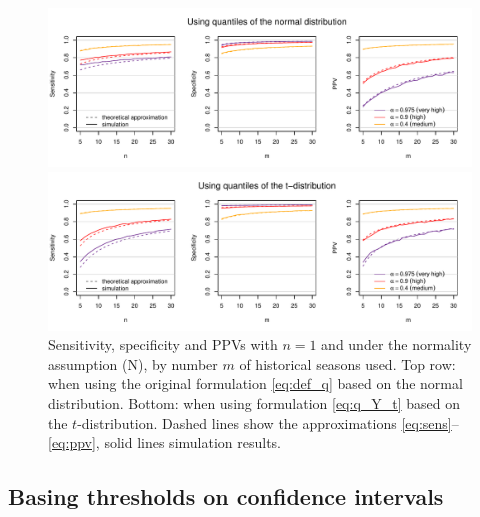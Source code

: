 \documentclass[12pt]{article}
\begin{document}
\begin{figure}[h!]
\begin{center}
\includegraphics[scale=0.75]{figure/analytical_sens_spec.pdf} \vspace{-5mm}

\includegraphics[scale=0.75]{figure/analytical_sens_spec_t.pdf}
\end{center}

\vspace{-10mm}

\caption{Sensitivity, specificity and PPVs with $n = 1$ and under the normality assumption (N), by number $m$ of historical seasons used. Top row: when using the original formulation \eqref{eq:def_q} based on the normal distribution. Bottom: when using formulation \eqref{eq:q_Y_t} based on the $t$-distribution. Dashed lines show the approximations \eqref{eq:sens}--\eqref{eq:ppv}, solid lines simulation results.}
\label{fig:sens_spec_ana}
\end{figure}



\subsection{Basing thresholds on confidence intervals}
\label{subsec:cis}
\end{document}
